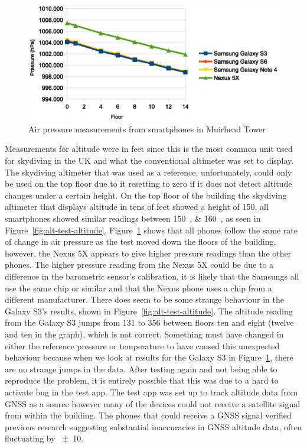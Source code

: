 \documentclass[11pt, a4paper, twocolumn]{article}
\begin{document}
\begin{figure}[h]
    \centering
    \includegraphics{alt-test-pressure}
    \caption{Air pressure measurements from smartphones in Muirhead Tower}\label{fig:alt-test-pressure}
\end{figure}

Measurements for altitude were in feet since this is the most common unit used for skydiving in the UK and what the conventional altimeter was set to display. The skydiving altimeter that was used as a reference, unfortunately, could only be used on the top floor due to it resetting to zero if it does not detect altitude changes under a certain height. On the top floor of the building the skydiving altimeter that displays altitude in tens of feet showed a height of \SI{150}{\feet}, all smartphones showed similar readings between \SIlist{150; 160}{\feet}, as seen in Figure~\ref{fig:alt-test-altitude}.
Figure~\ref{fig:alt-test-pressure} shows that all phones follow the same rate of change in air pressure as the test moved down the floors of the building, however, the Nexus 5X appears to give higher pressure readings than the other phones. The higher pressure reading from the Nexus 5X could be due to a difference in the barometric sensor's calibration, it is likely that the Samsungs all use the same chip or similar and that the Nexus phone uses a chip from a different manufacturer.
There does seem to be some strange behaviour in the Galaxy S3's results, shown in Figure~\ref{fig:alt-test-altitude}. The altitude reading from the Galaxy S3 jumps from \SI{131}{\feet} to \SI{356}{\feet} between floors ten and eight (twelve and ten in the graph), which is not correct. Something must have changed in either the reference pressure or temperature to have caused this unexpected behaviour because when we look at results for the Galaxy S3 in Figure~\ref{fig:alt-test-pressure}, there are no strange jumps in the data. After testing again and not being able to reproduce the problem, it is entirely possible that this was due to a hard to activate bug in the test app. The test app was set up to track altitude data from GNSS as a source however many of the devices could not receive a satellite signal from within the building. The phones that could receive a GNSS signal verified previous research suggesting substantial inaccuracies in GNSS altitude data, often fluctuating by \SI{\pm10}{\feet}.
\end{document}

